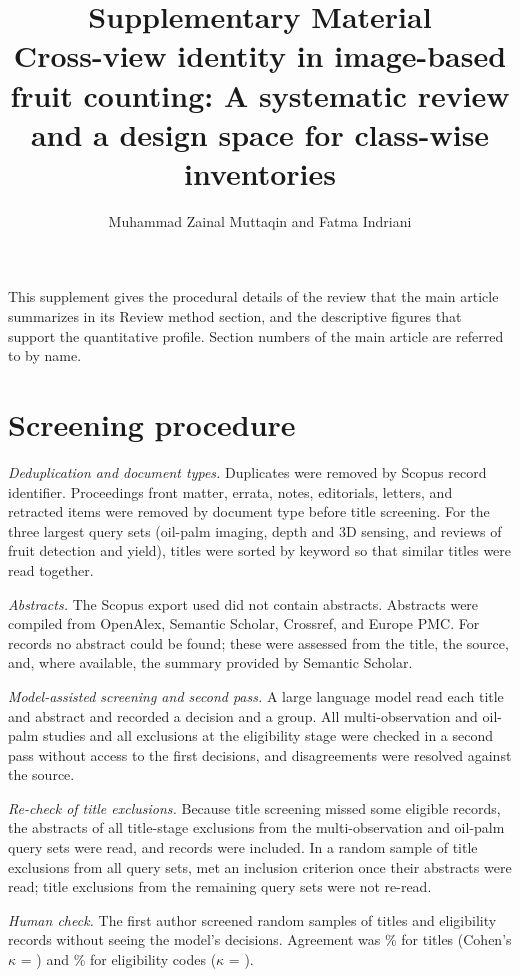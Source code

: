 \documentclass[a4paper,11pt]{article}
\title{Supplementary Material\\[4pt]\large Cross-view identity in image-based fruit counting: A systematic review and a design space for class-wise inventories}
\author{Muhammad Zainal Muttaqin and Fatma Indriani}
\date{}
\begin{document}
\maketitle

This supplement gives the procedural details of the review that the main article summarizes in its Review method section, and the descriptive figures that support the quantitative profile. Section numbers of the main article are referred to by name.

\section{Screening procedure}\label{sup:screening}

\textit{Deduplication and document types.} Duplicates were removed by Scopus record identifier. Proceedings front matter, errata, notes, editorials, letters, and retracted items were removed by document type before title screening. For the three largest query sets (oil-palm imaging, depth and 3D sensing, and reviews of fruit detection and yield), titles were sorted by keyword so that similar titles were read together.

\textit{Abstracts.} The Scopus export used did not contain abstracts. Abstracts were compiled from OpenAlex, Semantic Scholar, Crossref, and Europe PMC. For \nNoAbstract records no abstract could be found; these were assessed from the title, the source, and, where available, the summary provided by Semantic Scholar.

\textit{Model-assisted screening and second pass.} A large language model read each title and abstract and recorded a decision and a group. All multi-observation and oil-palm studies and all exclusions at the eligibility stage were checked in a second pass without access to the first decisions, and disagreements were resolved against the source.

\textit{Re-check of title exclusions.} Because title screening missed some eligible records, the abstracts of all \nTitleRecheck title-stage exclusions from the multi-observation and oil-palm query sets were read, and \nTitleReinstated records were included. In a random sample of \nSampleTitles title exclusions from all query sets, \nSampleTitlesEligible met an inclusion criterion once their abstracts were read; title exclusions from the remaining query sets were not re-read.

\textit{Human check.} The first author screened random samples of \nHumTitles titles and \nHumElig eligibility records without seeing the model's decisions. Agreement was \pHumTitles\% for titles (Cohen's $\kappa$ = \kHumTitles) and \pHumElig\% for eligibility codes ($\kappa$ = \kHumElig).
\end{document}
